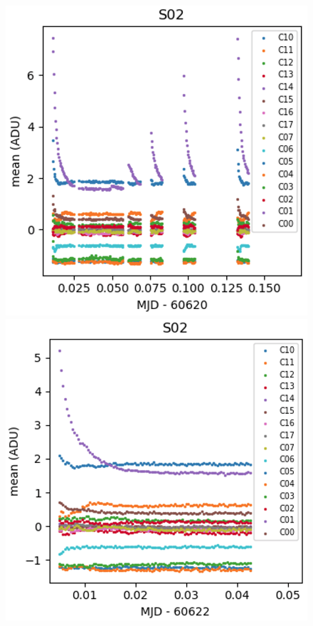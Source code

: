 \begin{figure}[htbp]
\centering
\begin{minipage}[b]{0.45\textwidth}
    \centering
    \includegraphics[width=\textwidth]{sections/figures/E2136_R33_S02.png}
\end{minipage}
\hspace{0.05\textwidth}
\begin{minipage}[b]{0.45\textwidth}
    \centering
    \includegraphics[width=\textwidth]{sections/figures/E2236_R33_S02.png}
\end{minipage}


\end{figure}
